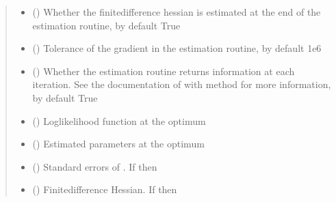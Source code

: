 \documentclass[a4paper,10pt,english]{sphinxhowto}
\begin{document}
\begin{fulllineitems}
\begin{fulllineitems}
\begin{quote}
\begin{description}
\begin{itemize}
\item {} 
\sphinxAtStartPar
{} (\sphinxstyleliteralemphasis{\sphinxupquote{, }}) \textendash{} Whether the finite\sphinxhyphen{}difference hessian is estimated at the end of the
estimation routine, by default True

\item {} 
\sphinxAtStartPar
{} (\sphinxstyleliteralemphasis{\sphinxupquote{, }}) \textendash{} Tolerance of the gradient in the estimation routine, by default 1e\sphinxhyphen{}6

\item {} 
\sphinxAtStartPar
{} (\sphinxstyleliteralemphasis{\sphinxupquote{, }}) \textendash{} Whether the estimation routine returns information at each iteration.
See the documentation of  with method
 for more information, by default True

\end{itemize}

\sphinxAtStartPar
\begin{itemize}
\item {} 
\sphinxAtStartPar
{} () \textendash{} Log\sphinxhyphen{}likelihood function at the optimum

\item {} 
\sphinxAtStartPar
{} () \textendash{} Estimated parameters at the optimum

\item {} 
\sphinxAtStartPar
{} () \textendash{} Standard errors of . If  then 

\item {} 
\sphinxAtStartPar
{} () \textendash{} Finite\sphinxhyphen{}difference Hessian. If  then 


\end{itemize}
\end{description}
\end{quote}
\end{fulllineitems}
\end{fulllineitems}
\end{document}
